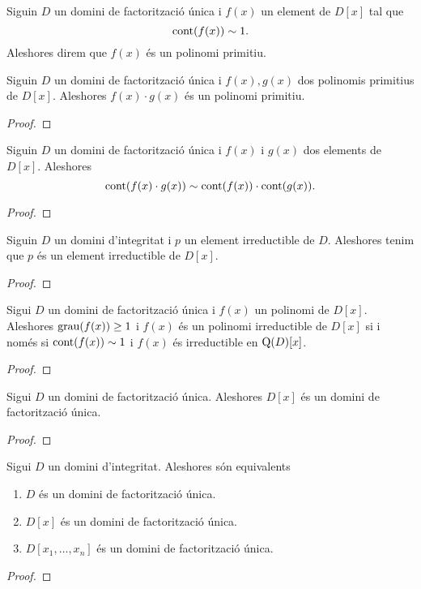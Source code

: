 \documentclass[../../Main.tex]{subfiles}
\begin{document}
	\begin{definition}
		Siguin \(D\) un domini de factorització única i \(f(x)\) un element de \(D[x]\) tal que
		\[\operatorname{cont}(f(x))\sim1.\]
		Aleshores direm que \(f(x)\) és un polinomi primitiu.
	\end{definition}
	\begin{lemma}
		\label{lema:lema de Gauss}
		Siguin \(D\) un domini de factorització única i \(f(x),g(x)\) dos polinomis primitius de \(D[x]\). Aleshores \(f(x)\cdot g(x)\) és un polinomi primitiu.
		\begin{proof}
		\end{proof}
	\end{lemma}
	\begin{corollary}
		Siguin \(D\) un domini de factorització única i \(f(x)\) i \(g(x)\) dos elements de \(D[x]\). Aleshores
		\[\operatorname{cont}(f(x)\cdot g(x))\sim\operatorname{cont}(f(x))\cdot\operatorname{cont}(g(x)).\]
		\begin{proof}
		\end{proof}
	\end{corollary}
	\begin{lemma}
		Siguin \(D\) un domini d'integritat i \(p\) un element irreductible de \(D\). Aleshores tenim que \(p\) és un element irreductible de \(D[x]\).
		\begin{proof}
		\end{proof}
	\end{lemma}
	\begin{theorem}
		Sigui \(D\) un domini de factorització única i \(f(x)\) un polinomi de \(D[x]\). Aleshores \(\operatorname{grau}(f(x))\geq1\) i \(f(x)\) és un polinomi irreductible de \(D[x]\) si i només si \(\operatorname{cont}(f(x))\sim1\) i \(f(x)\) és irreductible en \(\operatorname{Q}(D)[x]\).
		\begin{proof}
		\end{proof}
	\end{theorem}
	\begin{theorem}
		Sigui \(D\) un domini de factorització única. Aleshores \(D[x]\) és un domini de factorització única.
		\begin{proof}
		\end{proof}
	\end{theorem}
	\begin{theorem}
		Sigui \(D\) un domini d'integritat. Aleshores són equivalents
		\begin{enumerate}
			\item \(D\) és un domini de factorització única.
			\item \(D[x]\) és un domini de factorització única.
			\item \(D[x_{1},\dots,x_{n}]\) és un domini de factorització única.
		\end{enumerate}
		\begin{proof}
		\end{proof}
	\end{theorem}
\end{document}
